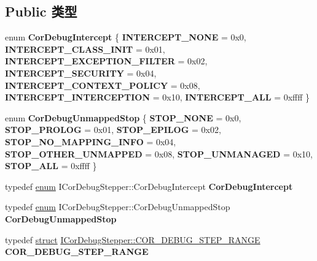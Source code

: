 \subsection*{Public 类型}
\begin{DoxyCompactItemize}
\item 
\mbox{\label{interface_i_cor_debug_stepper_a9e153b6d5085f1a61f46b846beca7508}} 
enum {\bfseries Cor\+Debug\+Intercept} \{ \newline
{\bfseries I\+N\+T\+E\+R\+C\+E\+P\+T\+\_\+\+N\+O\+NE} = 0x0, 
{\bfseries I\+N\+T\+E\+R\+C\+E\+P\+T\+\_\+\+C\+L\+A\+S\+S\+\_\+\+I\+N\+IT} = 0x01, 
{\bfseries I\+N\+T\+E\+R\+C\+E\+P\+T\+\_\+\+E\+X\+C\+E\+P\+T\+I\+O\+N\+\_\+\+F\+I\+L\+T\+ER} = 0x02, 
{\bfseries I\+N\+T\+E\+R\+C\+E\+P\+T\+\_\+\+S\+E\+C\+U\+R\+I\+TY} = 0x04, 
\newline
{\bfseries I\+N\+T\+E\+R\+C\+E\+P\+T\+\_\+\+C\+O\+N\+T\+E\+X\+T\+\_\+\+P\+O\+L\+I\+CY} = 0x08, 
{\bfseries I\+N\+T\+E\+R\+C\+E\+P\+T\+\_\+\+I\+N\+T\+E\+R\+C\+E\+P\+T\+I\+ON} = 0x10, 
{\bfseries I\+N\+T\+E\+R\+C\+E\+P\+T\+\_\+\+A\+LL} = 0xffff
 \}
\item 
\mbox{\label{interface_i_cor_debug_stepper_a447ffc2e81ff74dd65aa32421cd88ac4}} 
enum {\bfseries Cor\+Debug\+Unmapped\+Stop} \{ \newline
{\bfseries S\+T\+O\+P\+\_\+\+N\+O\+NE} = 0x0, 
{\bfseries S\+T\+O\+P\+\_\+\+P\+R\+O\+L\+OG} = 0x01, 
{\bfseries S\+T\+O\+P\+\_\+\+E\+P\+I\+L\+OG} = 0x02, 
{\bfseries S\+T\+O\+P\+\_\+\+N\+O\+\_\+\+M\+A\+P\+P\+I\+N\+G\+\_\+\+I\+N\+FO} = 0x04, 
\newline
{\bfseries S\+T\+O\+P\+\_\+\+O\+T\+H\+E\+R\+\_\+\+U\+N\+M\+A\+P\+P\+ED} = 0x08, 
{\bfseries S\+T\+O\+P\+\_\+\+U\+N\+M\+A\+N\+A\+G\+ED} = 0x10, 
{\bfseries S\+T\+O\+P\+\_\+\+A\+LL} = 0xffff
 \}
\item 
\mbox{\label{interface_i_cor_debug_stepper_a9b0d377743fcb0c08c3d4d76880fd6e3}} 
typedef \hyperlink{interfaceenum}{enum} I\+Cor\+Debug\+Stepper\+::\+Cor\+Debug\+Intercept {\bfseries Cor\+Debug\+Intercept}
\item 
\mbox{\label{interface_i_cor_debug_stepper_a0c1ce51beeb379bdbf49fb95955d870f}} 
typedef \hyperlink{interfaceenum}{enum} I\+Cor\+Debug\+Stepper\+::\+Cor\+Debug\+Unmapped\+Stop {\bfseries Cor\+Debug\+Unmapped\+Stop}
\item 
\mbox{\label{interface_i_cor_debug_stepper_a02415a60152a72b7ed934c4bd348ce3a}} 
typedef \hyperlink{interfacestruct}{struct} \hyperlink{struct_i_cor_debug_stepper_1_1_c_o_r___d_e_b_u_g___s_t_e_p___r_a_n_g_e}{I\+Cor\+Debug\+Stepper\+::\+C\+O\+R\+\_\+\+D\+E\+B\+U\+G\+\_\+\+S\+T\+E\+P\+\_\+\+R\+A\+N\+GE} {\bfseries C\+O\+R\+\_\+\+D\+E\+B\+U\+G\+\_\+\+S\+T\+E\+P\+\_\+\+R\+A\+N\+GE}
\end{DoxyCompactItemize}
